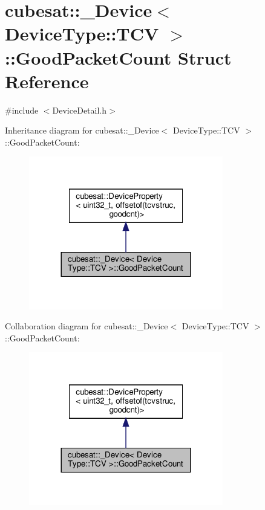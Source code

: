 \hypertarget{structcubesat_1_1__Device_3_01DeviceType_1_1TCV_01_4_1_1GoodPacketCount}{}\section{cubesat\+:\+:\+\_\+\+Device$<$ Device\+Type\+:\+:T\+CV $>$\+:\+:Good\+Packet\+Count Struct Reference}
\label{structcubesat_1_1__Device_3_01DeviceType_1_1TCV_01_4_1_1GoodPacketCount}


{\ttfamily \#include $<$Device\+Detail.\+h$>$}



Inheritance diagram for cubesat\+:\+:\+\_\+\+Device$<$ Device\+Type\+:\+:T\+CV $>$\+:\+:Good\+Packet\+Count\+:\nopagebreak
\begin{figure}[H]
\begin{center}
\leavevmode
\includegraphics[width=240pt]{structcubesat_1_1__Device_3_01DeviceType_1_1TCV_01_4_1_1GoodPacketCount__inherit__graph}
\end{center}
\end{figure}


Collaboration diagram for cubesat\+:\+:\+\_\+\+Device$<$ Device\+Type\+:\+:T\+CV $>$\+:\+:Good\+Packet\+Count\+:\nopagebreak
\begin{figure}[H]
\begin{center}
\leavevmode
\includegraphics[width=240pt]{structcubesat_1_1__Device_3_01DeviceType_1_1TCV_01_4_1_1GoodPacketCount__coll__graph}
\end{center}
\end{figure}
